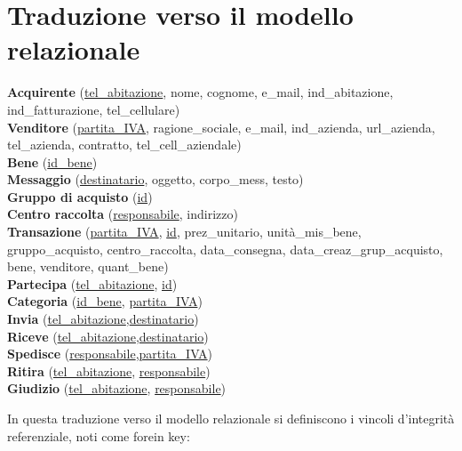 \documentclass[a4paper, 10pt]{report}
\begin{document}
\section{Traduzione verso il modello relazionale}
\begin{centering}
\textbf{Acquirente} (\underline{tel\_abitazione}, nome, cognome, e\_mail, ind\_abitazione, ind\_fatturazione, tel\_cellulare)\\
\textbf{Venditore} (\underline{partita\_IVA}, ragione\_sociale, e\_mail, ind\_azienda, url\_azienda, tel\_azienda, contratto, tel\_cell\_aziendale)\\
\textbf{Bene} (\underline{id\_bene})\\
\textbf{Messaggio} (\underline{destinatario}, oggetto, corpo\_mess, testo)\\
\textbf{Gruppo di acquisto} (\underline{id})\\
\textbf{Centro raccolta} (\underline{responsabile}, indirizzo)\\
\textbf{Transazione} (\underline{partita\_IVA}, \underline{id}, prez\_unitario, unit\`a\_mis\_bene, gruppo\_acquisto, centro\_raccolta, data\_consegna, data\_creaz\_grup\_acquisto, bene, venditore, quant\_bene)\\
\textbf{Partecipa} (\underline{tel\_abitazione}, \underline{id})\\
\textbf{Categoria} (\underline{id\_bene}, \underline{partita\_IVA})\\
\textbf{Invia} (\underline{tel\_abitazione},\underline{destinatario})\\
\textbf{Riceve} (\underline{tel\_abitazione},\underline{destinatario})\\
\textbf{Spedisce} (\underline{responsabile},\underline{partita\_IVA})\\
\textbf{Ritira} (\underline{tel\_abitazione}, \underline{responsabile})\\
\textbf{Giudizio} (\underline{tel\_abitazione}, \underline{responsabile})\\
\end{centering}
\bigskip

In questa traduzione verso il modello relazionale si definiscono i vincoli d'integrit\`a referenziale, noti come forein key:\\
\end{document}
